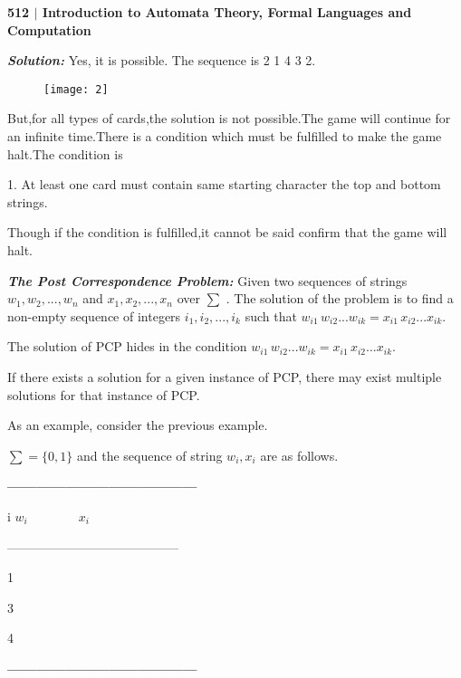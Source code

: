 \documentclass[10pt,a4paper]{book}
\begin{document}
\footnotesize

\begin{flushleft}
 \textsf{\textbf{ 512 $|$ Introduction to Automata Theory, Formal Languages and Computation}}
 
 \quad
 
\textit{ \textbf{Solution:}} Yes, it is possible. The sequence is 2 1 4 3 2.
\end{flushleft}

\begin{figure}[h]
  \centering
  \texttt{[image: 2]}
\end{figure}

But,for all types of cards,the solution is not possible.The game will continue for an infinite time.There is a condition which must be fulfilled to make the game halt.The condition is

\quad

1. At least one card must contain same starting character the top and bottom strings.
 
\quad Though if the condition is fulfilled,it cannot be said confirm that the game will halt.

\begin{flushleft}
\textit{\textbf{The Post Correspondence Problem:}} Given two sequences of strings $w_{1}, w_{2}, ... , w_{n}$ and $x_{1}, x_{2}, ... , x_{n}$ over $\sum$ .  The solution of the problem is to find a \quad non-empty sequence of integers $i_{1}, i_{2}, ... , i_{k}$ such that $w_{i1}\, w_{i2} ... w_{ik} = x_{i1}\, x_{i2} ... x_{ik}.$
\end{flushleft}

The solution of PCP hides in the condition $w_{i1}\, w_{i2} ... w_{ik} = x_{i1}\, x_{i2} ... x_{ik}$.

If there exists a solution for a given instance of PCP, there may exist multiple solutions for that
instance of PCP.

As an example, consider the previous example.

$\sum = \{0 , 1\}$ and the sequence of string $w_{i}, x_{i}$ are as follows.

\begin{table}[h]
  \centering
 \textbf{\textsf{ --------------------------------------- }}
  
 i \qquad\qquad $w_{i} \qquad\qquad x_{i}$
 
 -----------------------------------------
 
 1 \qquad{} \qquad{}
 
 
 \; \qquad{} \qquad{}
 
 
 3 \qquad{} \qquad{}
 
 
 4 \qquad\qquad\!\! \qquad\quad\;
 
\textsf{\textbf{ ---------------------------------------}}
\end{table}
\end{document}
